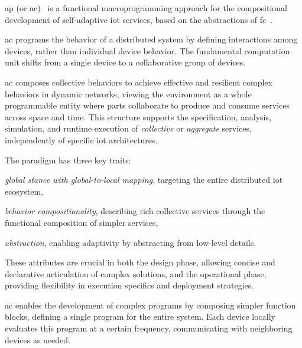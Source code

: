 \documentclass[12pt, a4paper]{article}
\newenvironment{inlinelist}{\begin{enumerate*}[label=\emph{(\roman*)}]}{\end{enumerate*}}
\begin{document}
\ac{ap} (or \ac{ac})~\cite{CASADEI2019252} is a functional macroprogramming approach for the compositional development
of self-adaptive \ac{iot} services,
based on the abstractions of \ac{fc}~\cite{MAMEIZL04}.

\ac{ac} programs the behavior of a distributed system by defining interactions among devices,
rather than individual device behavior.
%
The fundamental computation unit shifts from a single device to a collaborative group of devices.

\ac{ac} composes collective behaviors to achieve effective and resilient complex behaviors in dynamic networks,
viewing the environment as a whole programmable entity where parts collaborate to produce and consume services across space and time.
%
This structure supports the specification, analysis, simulation, and runtime execution of \emph{collective} or \emph{aggregate} services,
independently of specific \ac{iot} architectures.

The paradigm has three key traits:
\begin{inlinelist}
    \item \emph{global stance with global-to-local mapping}, targeting the entire distributed \ac{iot} ecosystem,
    \item \emph{behavior compositionality}, describing rich collective services through the functional composition of simpler services,
    \item \emph{abstraction}, enabling adaptivity by abstracting from low-level details.
\end{inlinelist}
%
These attributes are crucial in both the design phase, allowing concise and declarative articulation of complex solutions,
and the operational phase, providing flexibility in execution specifics and deployment strategies.

\ac{ac} enables the development of complex programs by composing simpler function blocks, defining a single program for
the entire system.
%
Each device locally evaluates this program at a certain frequency, communicating with neighboring devices as needed.
\end{document}
